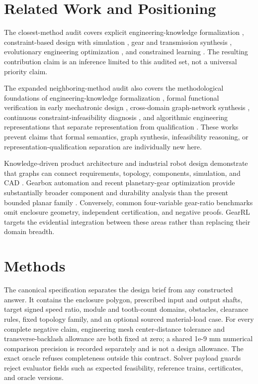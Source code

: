 \documentclass[preprint,12pt]{elsarticle}
\begin{document}
\section{Related Work and Positioning}
The closest-method audit covers explicit engineering-knowledge formalization \cite{hao-2021,bolognini-2022}, constraint-based design with simulation \cite{cicconi-2020}, gear and transmission synthesis \cite{fuerst-2021,geng-2023,kim-2026}, evolutionary engineering optimization \cite{fetanat-2023}, and constrained learning \cite{lin-2023}. The resulting contribution claim is an inference limited to this audited set, not a universal priority claim.

The expanded neighboring-method audit also covers the methodological foundations of engineering-knowledge formalization \cite{sacks-2020}, formal functional verification in early mechatronic design \cite{wang-2023-formal}, cross-domain graph-network synthesis \cite{shai-2008}, continuous constraint-infeasibility diagnosis \cite{khorshid-2018}, and algorithmic engineering representations that separate representation from qualification \cite{pandey-2025}. These works prevent claims that formal semantics, graph synthesis, infeasibility reasoning, or representation-qualification separation are individually new here.

Knowledge-driven product architecture and industrial robot design demonstrate that graphs can connect requirements, topology, components, simulation, and CAD \cite{huang-2025,sun-2026}. Gearbox automation and recent planetary-gear optimization provide substantially broader component and durability analysis than the present bounded planar family \cite{fuerst-2021,kim-2026}. Conversely, common four-variable gear-ratio benchmarks omit enclosure geometry, independent certification, and negative proofs. GearRL targets the evidential integration between these areas rather than replacing their domain breadth.

\section{Methods}
The canonical specification separates the design brief from any constructed answer. It contains the enclosure polygon, prescribed input and output shafts, target signed speed ratio, module and tooth-count domains, obstacles, clearance rules, fixed topology family, and an optional sourced material-load case. For every complete negative claim, engineering mesh center-distance tolerance and transverse-backlash allowance are both fixed at zero; a shared 1e-9 mm numerical comparison precision is recorded separately and is not a design allowance. The exact oracle refuses completeness outside this contract. Solver payload guards reject evaluator fields such as expected feasibility, reference trains, certificates, and oracle versions.
\end{document}
